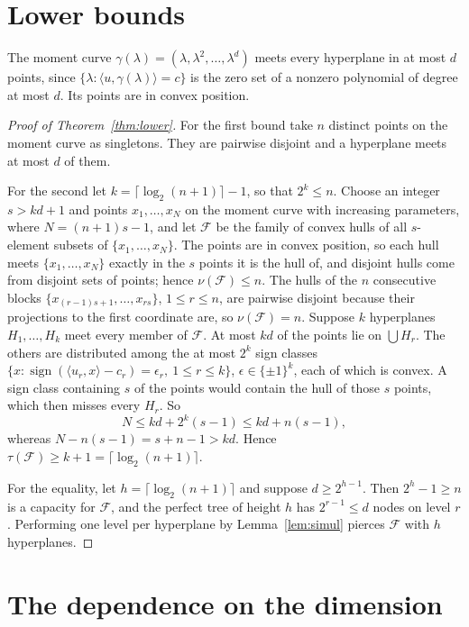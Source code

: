 \documentclass[11pt]{amsart}
\theoremstyle{remark}
\newcommand{\F}{\mathcal F}
\newcommand{\ceil}[1]{\lceil #1\rceil}
\begin{document}
\section{Lower bounds}\label{sec:lower}

The moment curve $\gamma(\lambda)=(\lambda,\lambda^2,\dots,\lambda^d)$ meets every hyperplane in at most $d$ points, since
$\{\lambda:\langle u,\gamma(\lambda)\rangle=c\}$ is the zero set of a nonzero polynomial of degree at most $d$. Its points are in
convex position.

\begin{proof}[Proof of Theorem~\ref{thm:lower}]
For the first bound take $n$ distinct points on the moment curve as singletons. They are pairwise disjoint and a
hyperplane meets at most $d$ of them.

For the second let $k=\ceil{\log_2(n+1)}-1$, so that $2^k\le n$. Choose an integer $s>kd+1$ and points
$x_1,\dots,x_N$ on the moment curve with increasing parameters, where $N=(n+1)s-1$, and let $\F$ be the family of
convex hulls of all $s$-element subsets of $\{x_1,\dots,x_N\}$. The points are in convex position, so each hull meets
$\{x_1,\dots,x_N\}$ exactly in the $s$ points it is the hull of, and disjoint hulls come from disjoint sets of points; hence $\nu(\F)\le n$.
The hulls of the $n$ consecutive blocks $\{x_{(r-1)s+1},\dots,x_{rs}\}$, $1\le r\le n$, are pairwise disjoint because
their projections to the first coordinate are, so $\nu(\F)=n$. Suppose $k$ hyperplanes $H_1,\dots,H_k$ meet every
member of $\F$. At most $kd$ of the points lie on $\bigcup H_r$. The others are distributed among the at most $2^k$
sign classes $\{x:\operatorname{sign}(\langle u_r,x\rangle-c_r)=\epsilon_r,\ 1\le r\le k\}$, $\epsilon\in\{\pm1\}^k$,
each of which is convex. A sign class containing $s$ of the points would contain the hull of those $s$ points, which
then misses every $H_r$. So
\[
N\le kd+2^k(s-1)\le kd+n(s-1),
\]
whereas $N-n(s-1)=s+n-1>kd$. Hence $\tau(\F)\ge k+1=\ceil{\log_2(n+1)}$.

For the equality, let $h=\ceil{\log_2(n+1)}$ and suppose $d\ge2^{h-1}$. Then $2^h-1\ge n$ is a capacity for $\F$, and
the perfect tree of height $h$ has $2^{r-1}\le d$ nodes on level $r$. Performing one level per hyperplane by
Lemma~\ref{lem:simul} pierces $\F$ with $h$ hyperplanes.
\end{proof}

\section{The dependence on the dimension}\label{sec:loss}
\end{document}
